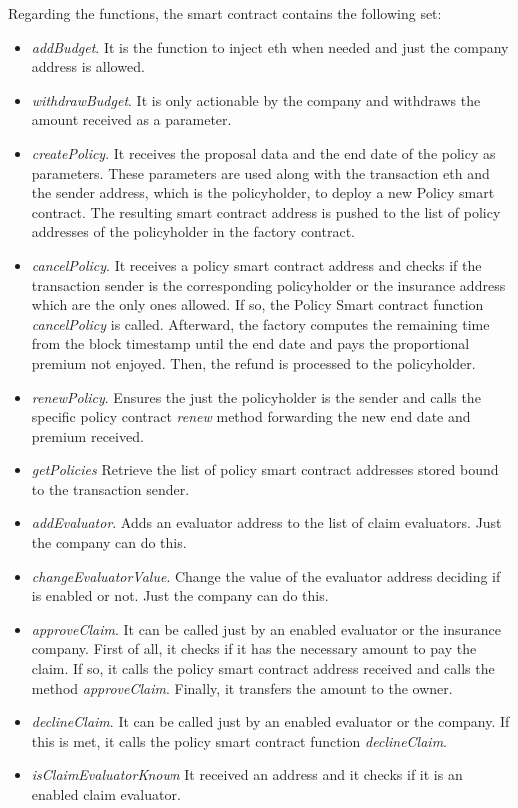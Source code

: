 {Regarding the functions, the smart contract contains the following set:
\begin{itemize}
    \item \textit{addBudget}. It is the function to inject \acrshort{eth} when needed and just the company address is allowed.
    \item \textit{withdrawBudget}. It is only actionable by the company and withdraws the amount received as a parameter.
    \item \textit{createPolicy}. It receives the proposal data and the end date of the policy as parameters. These parameters are used along with the transaction \acrshort{eth} and the sender address, which is the policyholder, to deploy a new Policy smart contract. The resulting smart contract address is pushed to the list of policy addresses of the policyholder in the factory contract.
    \item \textit{cancelPolicy}. It receives a policy smart contract address and checks if the transaction sender is the corresponding policyholder or the insurance address which are the only ones allowed. If so, the Policy Smart contract function \textit{cancelPolicy} is called. Afterward, the factory computes the remaining time from the block timestamp until the end date and pays the proportional premium not enjoyed. Then, the refund is processed to the policyholder.
    \item \textit{renewPolicy}. Ensures the just the policyholder is the sender and calls the specific policy contract \textit{renew} method forwarding the new end date and premium received.
    \item \textit{getPolicies} Retrieve the list of policy smart contract addresses stored bound to the transaction sender.
    \item \textit{addEvaluator}. Adds an evaluator address to the list of claim evaluators. Just the company can do this.
    \item \textit{changeEvaluatorValue}. Change the value of the evaluator address deciding if is enabled or not. Just the company can do this.
    \item \textit{approveClaim}. It can be called just by an enabled evaluator or the insurance company. First of all, it checks if it has the necessary amount to pay the claim. If so, it calls the policy smart contract address received and calls the method \textit{approveClaim}. Finally, it transfers the amount to the owner.
    \item \textit{declineClaim}. It can be called just by an enabled evaluator or the company. If this is met, it calls the policy smart contract function \textit{declineClaim}.
    \item \textit{isClaimEvaluatorKnown} It received an address and it checks if it is an enabled claim evaluator. 
\end{itemize}

}
